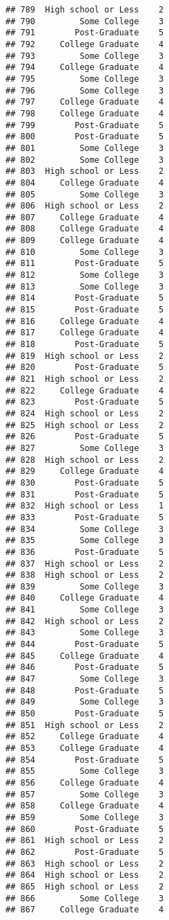\documentclass[
]{article}
\begin{document}
\begin{verbatim}
## 789  High school or Less    2
## 790         Some College    3
## 791        Post-Graduate    5
## 792     College Graduate    4
## 793         Some College    3
## 794     College Graduate    4
## 795         Some College    3
## 796         Some College    3
## 797     College Graduate    4
## 798     College Graduate    4
## 799        Post-Graduate    5
## 800        Post-Graduate    5
## 801         Some College    3
## 802         Some College    3
## 803  High school or Less    2
## 804     College Graduate    4
## 805         Some College    3
## 806  High school or Less    2
## 807     College Graduate    4
## 808     College Graduate    4
## 809     College Graduate    4
## 810         Some College    3
## 811        Post-Graduate    5
## 812         Some College    3
## 813         Some College    3
## 814        Post-Graduate    5
## 815        Post-Graduate    5
## 816     College Graduate    4
## 817     College Graduate    4
## 818        Post-Graduate    5
## 819  High school or Less    2
## 820        Post-Graduate    5
## 821  High school or Less    2
## 822     College Graduate    4
## 823        Post-Graduate    5
## 824  High school or Less    2
## 825  High school or Less    2
## 826        Post-Graduate    5
## 827         Some College    3
## 828  High school or Less    2
## 829     College Graduate    4
## 830        Post-Graduate    5
## 831        Post-Graduate    5
## 832  High school or Less    1
## 833        Post-Graduate    5
## 834         Some College    3
## 835         Some College    3
## 836        Post-Graduate    5
## 837  High school or Less    2
## 838  High school or Less    2
## 839         Some College    3
## 840     College Graduate    4
## 841         Some College    3
## 842  High school or Less    2
## 843         Some College    3
## 844        Post-Graduate    5
## 845     College Graduate    4
## 846        Post-Graduate    5
## 847         Some College    3
## 848        Post-Graduate    5
## 849         Some College    3
## 850        Post-Graduate    5
## 851  High school or Less    2
## 852     College Graduate    4
## 853     College Graduate    4
## 854        Post-Graduate    5
## 855         Some College    3
## 856     College Graduate    4
## 857         Some College    3
## 858     College Graduate    4
## 859         Some College    3
## 860        Post-Graduate    5
## 861  High school or Less    2
## 862        Post-Graduate    5
## 863  High school or Less    2
## 864  High school or Less    2
## 865  High school or Less    2
## 866         Some College    3
## 867     College Graduate    4

\end{verbatim}
\end{document}
